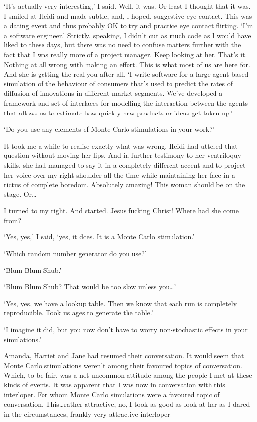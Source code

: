 `It's actually very interesting,' I said. Well, it was. Or least I
thought that it was. I smiled at Heidi and made subtle, and, I
hoped, suggestive eye contact. This was a dating event and thus
probably OK to try and practice eye contact flirting. `I'm a
software engineer.' Strictly, speaking, I didn't cut as much code as
I would have liked to these days, but there was no need to confuse
matters further with the fact that I was really more of a project
manager. Keep looking at her. That's it. Nothing at all wrong with
making an effort. This is what most of us are here for. And she is
getting the real you after all. `I write software for a large
agent-based simulation of the behaviour of consumers that's used to
predict the rates of diffusion of innovations in different market
segments. We've developed a framework and set of interfaces for
modelling the interaction between the agents that allows us to
estimate how quickly new products or ideas get taken up.'

`Do you use any elements of Monte Carlo stimulations in your work?'

It took me a while to realise exactly what was wrong. Heidi had
uttered that question without moving her lips. And in further
testimony to her ventriloquy skills, she had managed to say it in a
completely different accent and to project her voice over my right
shoulder all the time while maintaining her face in a rictus of
complete boredom. Absolutely amazing! This woman should be on the
stage. Or\dots

I turned to my right. And started. Jesus fucking Christ!
Where had {\twelveit she\/} come from?

`Yes, yes,' I said, `yes, it does. It is a Monte Carlo stimulation.'

`Which random number generator do you use?'

`Blum Blum Shub.'

`Blum Blum Shub? That would be too slow unless you\dots'

`Yes, yes, we have a lookup table. Then we know that each run is
completely reproducible. Took us ages to generate the table.'

`I imagine it did, but you now don't have to worry non-stochastic
effects in your simulations.'

Amanda, Harriet and Jane had resumed their conversation. It would
seem that Monte Carlo stimulations weren't among their favoured
topics of conversation. Which, to be fair, was a not uncommon
attitude among the people I met at these kinds of events. It was
apparent that I was now in conversation with this interloper. For
whom Monte Carlo simulations {\twelveit were\/} a favoured topic of
conversation. This\dots rather attractive, no, I took as good as
look at her as I dared in the circumstances, frankly {\twelveit very
\/} attractive interloper.

